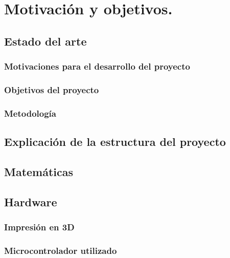 \chapter{Motivación y objetivos.}
\section{Estado del arte}
\subsection{Motivaciones para el desarrollo del proyecto}
\subsection{Objetivos del proyecto}
\subsection{Metodología}
\section{Explicación de la estructura del proyecto}
\section{Matemáticas}
\section{Hardware}
\subsection{Impresión en 3D}
\subsection{Microcontrolador utilizado}
